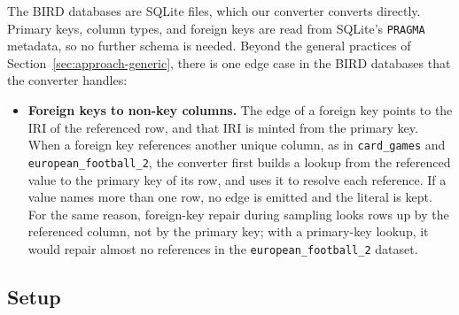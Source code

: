 The BIRD databases are SQLite files, which our converter converts directly. Primary keys, column types, and foreign keys are read from SQLite's \texttt{PRAGMA} metadata, so no further schema is needed. Beyond the general practices of Section~\ref{sec:approach-generic}, there is one edge case in the BIRD databases that the converter handles:
\begin{itemize}[leftmargin=*, itemsep=2pt]
  \item \textbf{Foreign keys to non-key columns.} The edge of a foreign key points to the IRI of the referenced row, and that IRI is minted from the primary key. When a foreign key references another unique column, as in \texttt{card\_games} and \texttt{european\_football\_2}, the converter first builds a lookup from the referenced value to the primary key of its row, and uses it to resolve each reference. If a value names more than one row, no edge is emitted and the literal is kept. For the same reason, foreign-key repair during sampling looks rows up by the referenced column, not by the primary key; with a primary-key lookup, it would repair almost no references in the \texttt{european\_football\_2} dataset.
\end{itemize}
\subsection{Setup}\label{sec:setup}

